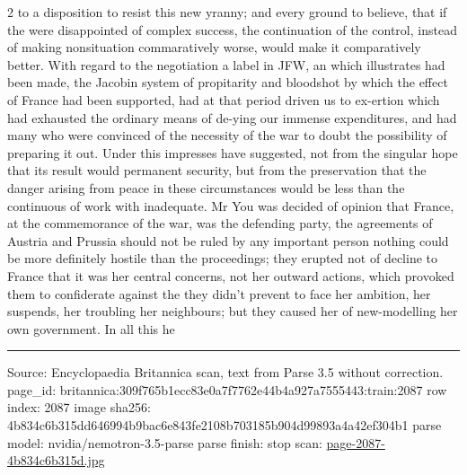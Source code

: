 \documentclass[10pt]{article}
\begin{document}
\begin{multicols}{2}
to a disposition to resist this new yranny; and every ground to believe, that if the were disappointed of complex success, the continuation of the control, instead of making nonsituation commaratively worse, would make it comparatively better. With regard to the negotiation a label in JFW, an which illustrates had been made, the Jacobin system of propitarity and bloodshot by which the effect of France had been supported, had at that period driven us to ex-ertion which had exhausted the ordinary means of de-ying our immense expenditures, and had many who were convinced of the necessity of the war to doubt the possibility of preparing it out. Under this impresses have suggested, not from the singular hope that its result would permanent security, but from the preservation that the danger arising from peace in these circumstances would be less than the continuous of work with inadequate. Mr You was decided of opinion that France, at the commemorance of the war, was the defending party, the agreements of Austria and Prussia should not be ruled by any important person nothing could be more definitely hostile than the proceedings; they erupted not of decline to France that it was her central concerns, not her outward actions, which provoked them to confiderate against the they didn't prevent to face her ambition, her suspends, her troubling her neighbours; but they caused her of new-modelling her own government. In all this he

\end{multicols}
\vfill\par\noindent\rule{\linewidth}{0.4pt}\par
{\scriptsize\color{gray}\noindent Source: Encyclopaedia Britannica scan, text from Parse 3.5 without correction. page\_id: britannica:309f765b1ecc83e0a7f7762e44b4a927a7555443:train:2087 \quad row index: 2087 \quad image sha256: 4b834c6b315dd646994b9bac6e843fe2108b703185b904d99893a4a42ef304b1 \quad parse model: nvidia/nemotron-3.5-parse \quad parse finish: stop \quad scan: \href{../scans/page-2087-4b834c6b315d.jpg}{page-2087-4b834c6b315d.jpg}\par}
\end{document}
